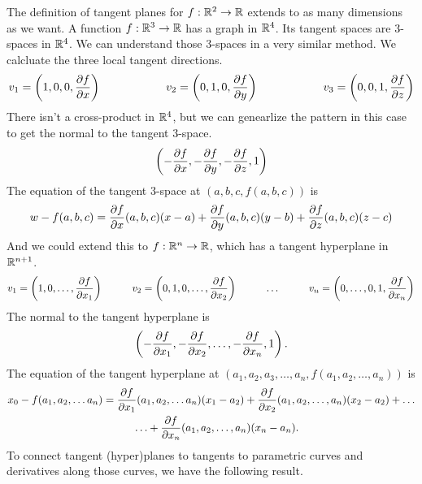 \documentclass[fleqn,letterpaper]{report}
\begin{document}
The definition of tangent planes for $f: \mathbb{R}^2 \rightarrow
\mathbb{R}$ extends to as many dimensions as we want. A function $f:
\mathbb{R}^3 \rightarrow \mathbb{R}$ has a graph in $\mathbb{R}^4$. Its tangent
spaces are 3-spaces in $\mathbb{R}^4$. We can understand those
3-spaces in a very similar method. We calcluate the three
local tangent directions. 
\begin{equation*}
v_1 = \left( 1, 0, 0, \frac{\partial f}{\partial x} \right)
\hspace{2cm}
v_2 = \left( 0, 1, 0, \frac{\partial f}{\partial y} \right)
\hspace{2cm}
v_3 = \left( 0, 0, 1, \frac{\partial f}{\partial z} \right) 
\end{equation*}
There isn't a cross-product in $\mathbb{R}^4$, but we can genearlize
the pattern in this case to get the normal to the tangent
3-space. 
\begin{equation*}
\left( - \frac{\partial f}{\partial x}, - \frac{\partial f}{\partial y}, -
\frac{\partial f}{\partial z}, 1 \right)
\end{equation*}
The equation of the tangent 3-space at $(a,b,c,f(a,b,c))$ is 
\begin{equation*}
w - f(a,b,c) = \frac{\partial f}{\partial x}(a,b,c) (x-a) + \frac{\partial
f}{\partial y} (a,b,c) (y-b) + \frac{\partial f}{\partial z} (a,b,c) (z-c)
\end{equation*}
And we could extend this to $f: \mathbb{R}^n \rightarrow \mathbb{R}$, which
has a tangent hyperplane in $\mathbb{R}^{n+1}$. 
\begin{equation*}
v_1 = \left( 1, 0, \ldots, \frac{\partial f}{\partial x_1} \right)
\hspace{1cm} 
v_2 = \left( 0, 1, 0, \ldots, \frac{\partial f}{\partial x_2} \right)
\hspace{1cm} \ldots \hspace{1cm} 
v_n = \left( 0, \ldots, 0, 1, \frac{\partial f}{\partial x_n} \right) 
\end{equation*}
The normal to the tangent hyperplane is 
\begin{equation*}
\left( - \frac{\partial f}{\partial x_1}, - \frac{\partial f}{\partial x_2},
\ldots, - \frac{\partial f}{\partial x_n}, 1 \right).
\end{equation*}
The equation of the tangent hyperplane at $(a_1, a_2, a_3,
\ldots, a_n, f(a_1, a_2, \ldots, a_n))$ is 
\begin{align*}
x_0 - f(a_1, a_2, \ldots a_n) & = \frac{\partial f}{\partial x_1}(a_1,
a_2, \ldots a_n ) (x_1-a_2) + \frac{\partial f}{\partial x_2} (a_1,
a_2, \ldots, a_n) (x_2-a_2) + \ldots \\
& \hspace{1cm} \ldots + \frac{\partial f}{\partial x_n}
(a_1, a_2, \ldots, a_n) (x_n - a_n).
\end{align*}
To connect tangent (hyper)planes to tangents to parametric
curves and derivatives along those curves, we have the
following result.
\end{document}
